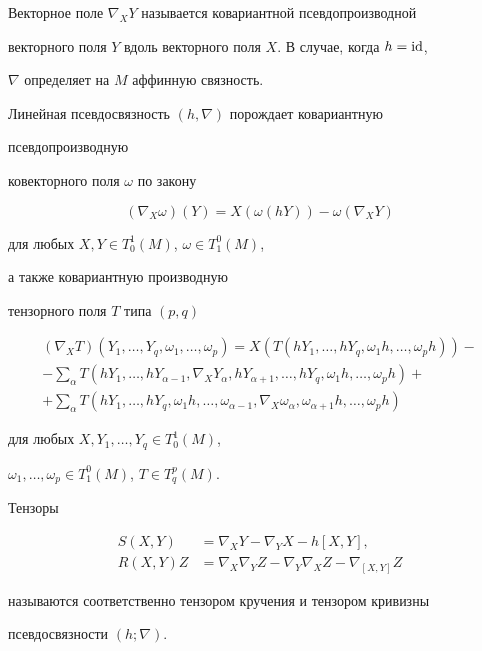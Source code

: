 Векторное поле $\nabla_X Y$ называется ковариантной псевдопроизводной


векторного поля $Y$ вдоль векторного поля $X$. В случае, когда $h=\operatorname{id}$,


$\nabla$ определяет на $M$ аффинную связность.





Линейная псевдосвязность $(h,\nabla)$ порождает ковариантную


псевдопроизводную


ковекторного поля $\omega$ по закону


\begin{equation}


(\nabla_X\omega)(Y)=X(\omega(hY))-\omega(\nabla_X Y)


\end{equation}


для любых $X,Y\in T^1_0(M)$, $\omega\in T^0_1(M)$,


а также ковариантную производную


тензорного поля $T$ типа $(p,q)$


\begin{multline}


(\nabla_X T)(Y_1,\dotsc,Y_q,\omega_1,\dotsc,\omega_p)=


X(T(hY_1,\dotsc,hY_q,\omega_1h,\dotsc,\omega_ph))- \\


-\sum_\alpha T(hY_1,\dotsc,hY_{\alpha-1},\nabla_X


Y_\alpha, h Y_{\alpha+1},\dotsc,hY_q,\omega_1h,\dotsc,\omega_ph)+ \\


+\sum_\alpha T(hY_1,\dotsc,hY_q,\omega_1h,\dotsc,\omega_{\alpha-1},


\nabla_X\omega_\alpha,\omega_{\alpha+1}h,\dotsc,\omega_p h)


\end{multline}


для любых $X,Y_1,\dotsc,Y_q\in T^1_0(M)$,


$\omega_1,\dotsc,\omega_p\in T^0_1(M)$, $T\in T^p_q(M)$.





\begin{defn} Тензоры


\begin{align}


S(X,Y)&=\nabla_X Y-\nabla_Y X-h[X,Y],\\


R(X,Y)Z&=\nabla_X\nabla_Y Z-\nabla_Y\nabla_X Z-


\nabla_{[X,Y]}Z


\end{align}


называются соответственно тензором кручения и тензором кривизны


псевдосвязности $(h;\nabla)$.


\end{defn}





